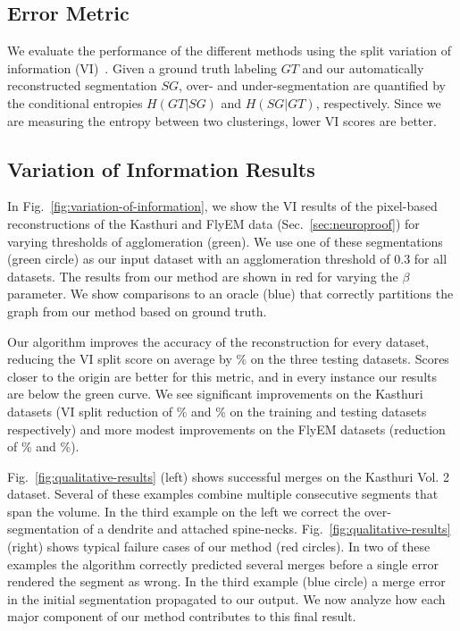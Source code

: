 \subsection{Error Metric}
\label{sec:variation-of-information}

We evaluate the performance of the different methods using the split variation of information (VI)~\cite{meila2003comparing}.
Given a ground truth labeling $GT$ and our automatically reconstructed segmentation $SG$, over- and under-segmentation are quantified by the conditional entropies $H(GT | SG)$ and $H(SG | GT)$, respectively. 
Since we are measuring the entropy between two clusterings, lower VI scores are better.

\subsection{Variation of Information Results}

In Fig.~\ref{fig:variation-of-information}, we show the VI results of the pixel-based reconstructions of the Kasthuri and FlyEM data (Sec.~\ref{sec:neuroproof}) for varying thresholds of agglomeration (green). 
We use one of these segmentations (green circle) as our input dataset with an agglomeration threshold of 0.3 for all datasets. 
The results from our method are shown in red for varying the $\beta$ parameter. 
We show comparisons to an oracle (blue) that correctly partitions the graph from our method based on ground truth.

Our algorithm improves the accuracy of the reconstruction for every dataset, reducing the VI split score on average by \% on the three testing datasets. 
Scores closer to the origin are better for this metric, and in every instance our results are below the green curve.
We see significant improvements on the Kasthuri datasets (VI split reduction of \% and \% on the training and testing datasets respectively) and more modest improvements on the FlyEM datasets (reduction of \% and \%). 

Fig.~\ref{fig:qualitative-results} (left) shows successful merges on the Kasthuri Vol. 2 dataset. 
Several of these examples combine multiple consecutive segments that span the volume.
In the third example on the left we correct the over-segmentation of a dendrite and attached spine-necks.
Fig.~\ref{fig:qualitative-results} (right) shows typical failure cases of our method (red circles).
In two of these examples the algorithm correctly predicted several merges before a single error rendered the segment as wrong.
In the third example (blue circle) a merge error in the initial segmentation propagated to our output.
We now analyze how each major component of our method contributes to this final result.

